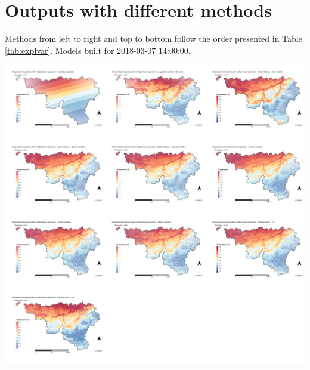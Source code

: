 \documentclass[12pt,twoside]{reedthesis}
\theoremstyle{definition}
\theoremstyle{definition}
\theoremstyle{definition}
\theoremstyle{remark}
\begin{document}
\chapter{Outputs with different
methods}\label{outputs-with-different-methods}

Methods from left to right and top to bottom follow the order presented
in Table \ref{tab:explvar}. Models built for 2018-03-07 14:00:00.
\begin{center}\includegraphics[width=1\linewidth]{figure/2018-03-07_14} \end{center}
\end{document}

